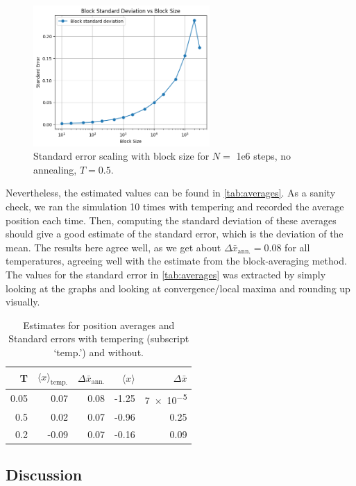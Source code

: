 \documentclass[11pt]{article}
\newcommand{\sub}[1]{_{\text{#1}}}
\begin{document}
\begin{figure}
	\centering
	\includegraphics[width = 0.6\textwidth]{block_average.png}
	\caption{Standard error scaling with block size for $N =$ 1e6 steps, no annealing, $T = 0.5$.}
	\label{fig:converge}
\end{figure}

Nevertheless, the estimated values can be found in \autoref{tab:averages}.
As a sanity check, we ran the simulation 10 times with tempering and recorded the average position each time. Then, computing the standard deviation of these averages should give a good estimate of the standard error, which is the deviation of the mean.
The results here agree well, as we get about $\Delta\bar x\sub{ann.} = 0.08$ for all temperatures, agreeing well with the estimate from the block-averaging method.
The values for the standard error in \autoref{tab:averages} was extracted by simply looking at the graphs and looking at convergence/local maxima and rounding up visually.


\begin{table}
	\centering
		\caption{Estimates for position averages and Standard errors with tempering (subscript `temp.') and without.}
	\label{tab:averages}
	\begin{tabular}{r r r r r}\hline
		T & $\langle x \rangle\sub{temp.}$ & $\Delta \bar x\sub{ann.}$ & $\langle x \rangle$ & $\Delta \bar x$\\\hline
		0.05 & 0.07 & 0.08 & -1.25 & \num{7e-5}\\
		0.5 & 0.02 & 0.07 & -0.96 & 0.25\\
		0.2 & -0.09 & 0.07 & -0.16 & 0.09\\\hline\hline
	\end{tabular}

\end{table}


\subsection{Discussion}
\end{document}
